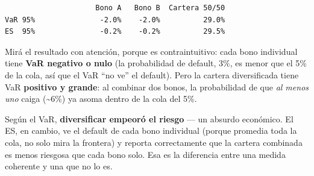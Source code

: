 \documentclass[
  spanish,
  letterpaper,
  DIV=11,
  numbers=noendperiod]{scrreprt}
\begin{document}
\begin{verbatim}
                     Bono A   Bono B  Cartera 50/50
VaR 95%               -2.0%    -2.0%          29.0%
ES  95%               -0.2%    -0.2%          29.5%
\end{verbatim}

Mirá el resultado con atención, porque es contraintuitivo: cada bono
individual tiene \textbf{VaR negativo o nulo} (la probabilidad de
default, 3\%, es menor que el 5\% de la cola, así que el VaR ``no ve''
el default). Pero la cartera diversificada tiene VaR \textbf{positivo y
grande}: al combinar dos bonos, la probabilidad de que \emph{al menos
uno} caiga (\textasciitilde6\%) ya asoma dentro de la cola del 5\%.

Según el VaR, \textbf{diversificar empeoró el riesgo} --- un absurdo
económico. El ES, en cambio, ve el default de cada bono individual
(porque promedia toda la cola, no solo mira la frontera) y reporta
correctamente que la cartera combinada es menos riesgosa que cada bono
solo. Esa es la diferencia entre una medida coherente y una que no lo
es.
\end{document}
